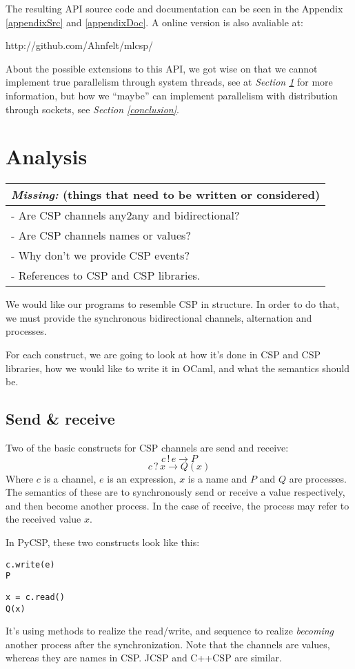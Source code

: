\documentclass[a4paper,12pt]{article}
\newcommand{\missing}[1]{
\begin{tabular}{|p{11cm}|}
\hline
\emph{Missing:} {\scriptsize (things that need to be written or considered)} \\
\hline
#1
\hline
\end{tabular}
}
\begin{document}
The resulting API source code and documentation can be seen in the Appendix
\ref{appendixSrc} and \ref{appendixDoc}. A online version is also avaliable at:

\begin{center}
http://github.com/Ahnfelt/mlcsp/
\end{center}

About the possible extensions to this API, we got wise on that we cannot
implement true parallelism through system threads, see at {\it Section
\ref{analysis}} for more information, but how we ``maybe'' can implement
parallelism with distribution through sockets, see {\it Section 
\ref{conclusion}}.

\section{Analysis}
\label{analysis}
\missing{
- Are CSP channels any2any and bidirectional? \\
- Are CSP channels names or values? \\
- Why don't we provide CSP events? \\
- References to CSP and CSP libraries. \\
}

We would like our programs to resemble CSP in structure. In order to do that, we must
provide the synchronous bidirectional channels, alternation and processes.

For each construct, we are going to look at how it's done in CSP and CSP libraries,
how we would like to write it in OCaml, and what the semantics should be.

\subsection{Send \& receive}

Two of the basic constructs for CSP channels are send and receive:
\[c\,!\,e \to P\]
\[c\,?\,x \to Q(x)\]
Where $c$ is a channel, $e$ is an expression, $x$ is a name and $P$ and $Q$ are processes. 
The semantics of these are to synchronously send or receive a value respectively, and
then become another process. In the case of receive, the process may refer to the
received value $x$.

In PyCSP, these two constructs look like this:
\begin{verbatim}
c.write(e)
P
\end{verbatim}
\begin{verbatim}
x = c.read()
Q(x)
\end{verbatim}
It's using methods to realize the read/write, and sequence to realize \emph{becoming}
another process after the synchronization. Note that the channels are values, whereas
they are names in CSP. JCSP and C++CSP are similar.
\end{document}
